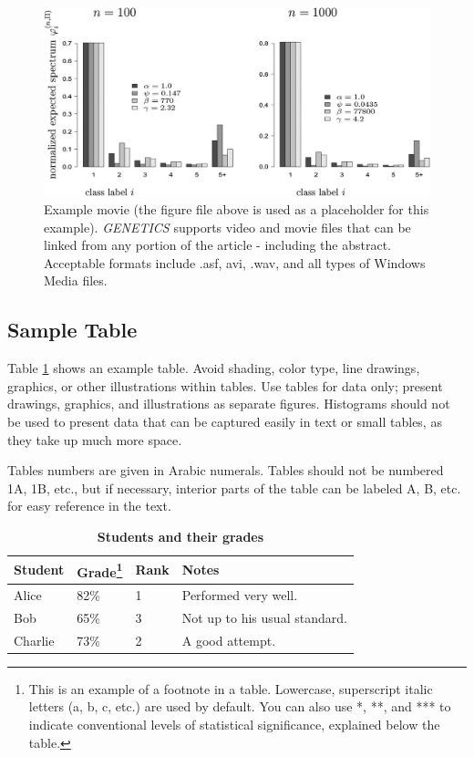 \documentclass[9pt,twocolumn,twoside]{gsajnl}
\begin{document}
\begin{figure}[htbp]
\centering
\includegraphics[width=\linewidth]{example-figure}
\caption{Example movie (the figure file above is used as a placeholder for this example). \textit{GENETICS} supports video and movie files that can be linked from any portion of the article - including the abstract. Acceptable formats include .asf, avi, .wav, and all types of Windows Media files.   
}%
\label{video:spectrum}
\end{figure}


\subsection*{Sample Table}

Table \ref{tab:shape-functions} shows an example table. Avoid shading, color type, line drawings, graphics, or other illustrations within tables. Use tables for data only; present drawings, graphics, and illustrations as separate figures. Histograms should not be used to present data that can be captured easily in text or small tables, as they take up much more space.  

Tables numbers are given in Arabic numerals. Tables should not be numbered 1A, 1B, etc., but if necessary, interior parts of the table can be labeled A, B, etc. for easy reference in the text.  


\begin{table}[htbp]
\centering
\caption{\bf Students and their grades}
\begin{tableminipage}{\textwidth}
\begin{tabularx}{\textwidth}{XXXX}
\hline
Student & Grade\footnote{This is an example of a footnote in a table. Lowercase, superscript italic letters (a, b, c, etc.) are used by default. You can also use *, **, and *** to indicate conventional levels of statistical significance, explained below the table.} & Rank & Notes \\
\hline
Alice & 82\% & 1 & Performed very well.\\
Bob & 65\% & 3 & Not up to his usual standard.\\
Charlie & 73\% & 2 & A good attempt.\\
\hline
\end{tabularx}
  \label{tab:shape-functions}
\end{tableminipage}
\end{table}
\end{document}
